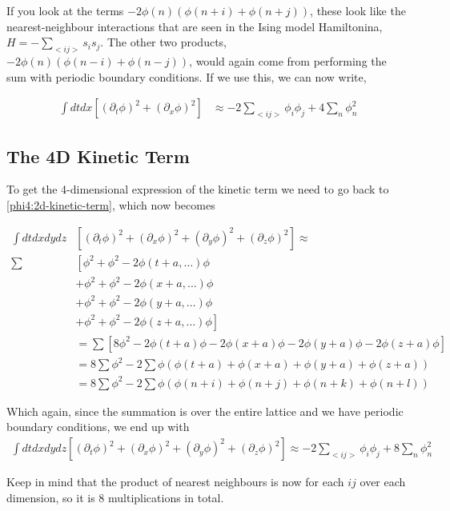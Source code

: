 If you look at the terms $- 2\phi(n) \left( \phi(n+i) + \phi(n+j) \right)$, these look like the nearest-neighbour
interactions that are seen in the Ising model Hamiltonina, $H = -\sum_{<ij>}s_i s_j$.
The other two products, $- 2\phi(n) \left( \phi(n-i) + \phi(n-j) \right)$, would again come from performing the sum with
periodic boundary conditions.
If we use this, we can now write,

\begin{align*}
\int dt dx \left[ \left( \partial_t \phi \right)^2 + \left( \partial_x \phi \right)^2 \right] &\approx
- 2 \sum_{<ij>} \phi_i \phi_j + 4 \sum_n \phi^{2}_{n} 
\end{align*}


\subsection{The 4D Kinetic Term}

To get the 4-dimensional expression of the kinetic term we need to go back to \ref{phi4:2d-kinetic-term}, which now becomes

\begin{align*}
\int dt dx dy dz & \left[ 
    \left( \partial_t \phi \right)^2 + \left( \partial_x \phi \right)^2 +  \left( \partial_y \phi \right)^2 + \left( \partial_z \phi \right)^2
\right] \approx \\
\sum & \left[ \phi^2 + \phi^2 - 2\phi(t+a, \ldots) \phi \right. \\
    & + \phi^2 + \phi^2 - 2\phi(x+a, \ldots) \phi \\
    & + \phi^2 + \phi^2 - 2\phi(y+a, \ldots) \phi \\
    & \left. + \phi^2 + \phi^2 - 2\phi(z+a, \ldots) \phi \right] \\
&= \sum \left[ 8\phi^2 - 2\phi(t+a)\phi - 2\phi(x+a)\phi - 2\phi(y+a)\phi - 2\phi(z+a)\phi \right] \\
&= 8 \sum \phi^2 - 2 \sum \phi \left( \phi(t+a) + \phi(x+a) + \phi(y+a) + \phi(z+a) \right) \\
&= 8 \sum \phi^{2} - 2 \sum \phi \left( \phi(n+i) + \phi(n+j) + \phi(n+k) + \phi(n+l) \right)
\end{align*}

Which again, since the summation is over the entire lattice and we have periodic boundary conditions,
we end up with
\begin{align*}
\int dt dx dy dz \left[ 
    \left( \partial_t \phi \right)^2 + \left( \partial_x \phi \right)^2 +  \left( \partial_y \phi \right)^2 + \left( \partial_z \phi \right)^2
\right] \approx 
- 2 \sum_{<ij>} \phi_i \phi_j + 8 \sum_n \phi^{2}_{n}
\end{align*}

Keep in mind that the product of nearest neighbours is now for each $ij$ over each dimension, so it is 8 multiplications in total.